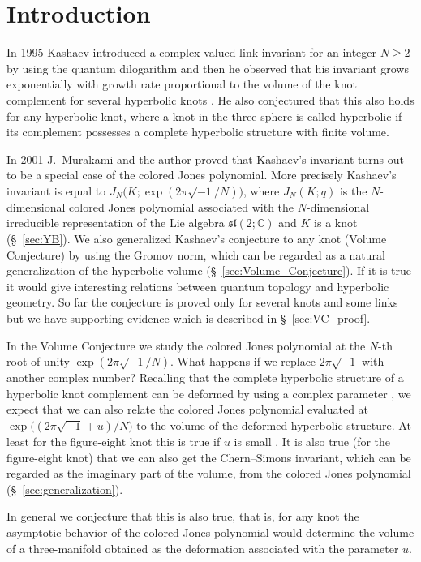 \documentclass{amsart}
\newcommand{\C}{\mathbb{C}}
\theoremstyle{definition}
\theoremstyle{remark}
\numberwithin{equation}{section}
\begin{document}
\section{Introduction}
In 1995 Kashaev introduced a complex valued link invariant for an integer $N\ge 2$ by using the quantum dilogarithm \cite{Kashaev:MODPLA95} and then he observed that his invariant grows exponentially with growth rate proportional to the volume of the knot complement for several hyperbolic knots \cite{Kashaev:LETMP97}.
He also conjectured that this also holds for any hyperbolic knot, where a knot in the three-sphere is called hyperbolic if its complement possesses a complete hyperbolic structure with finite volume.
\par
In 2001 J.~Murakami and the author proved that Kashaev's invariant turns out to be a special case of the colored Jones polynomial.
More precisely Kashaev's invariant is equal to $J_N\bigl(K;\exp(2\pi\sqrt{-1}/N)\bigr)$, where $J_N(K;q)$ is the $N$-dimensional colored Jones polynomial associated with the $N$-dimensional irreducible representation of the Lie algebra $\mathfrak{sl}(2;\C)$ and $K$ is a knot (\S~\ref{sec:YB}).
We also generalized Kashaev's conjecture to any knot (Volume Conjecture) by using the Gromov norm, which can be regarded as a natural generalization of the hyperbolic volume (\S~\ref{sec:Volume_Conjecture}).
If it is true it would give interesting relations between quantum topology and hyperbolic geometry.
So far the conjecture is proved only for several knots and some links but we have supporting evidence which is described in \S~\ref{sec:VC_proof}.
\par
In the Volume Conjecture we study the colored Jones polynomial at the $N$-th root of unity $\exp(2\pi\sqrt{-1}/N)$.
What happens if we replace $2\pi\sqrt{-1}$ with another complex number?
Recalling that the complete hyperbolic structure of a hyperbolic knot complement can be deformed by using a complex parameter \cite{Thurston:GT3M}, we expect that we can also relate the colored Jones polynomial evaluated at $\exp\bigl((2\pi\sqrt{-1}+u)/N\bigr)$ to the volume of the deformed hyperbolic structure.
At least for the figure-eight knot this is true if $u$ is small \cite{Murakami/Yokota:JREIA2007}.
It is also true (for the figure-eight knot) that we can also get the Chern--Simons invariant, which can be regarded as the imaginary part of the volume, from the colored Jones polynomial (\S~\ref{sec:generalization}).
\par
In general we conjecture that this is also true, that is, for any knot the asymptotic behavior of the colored Jones polynomial would determine the volume of a three-manifold obtained as the deformation associated with the parameter $u$.
\end{document}
